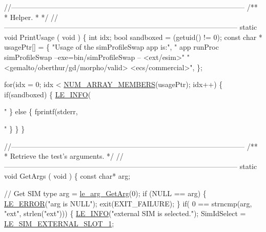 \begin{DoxyCodeInclude}
{{{{{{{{{{{{{\textcolor{comment}{//--------------------------------------------------------------------------------------------------}\textcolor{comment}{}
\textcolor{comment}{/**}
\textcolor{comment}{ * Helper.}
\textcolor{comment}{ *}
\textcolor{comment}{ */}
\textcolor{comment}{//--------------------------------------------------------------------------------------------------}
\textcolor{keyword}{static} \textcolor{keywordtype}{void} PrintUsage
(
    \textcolor{keywordtype}{void}
)
\{
    \textcolor{keywordtype}{int} idx;
    \textcolor{keywordtype}{bool} sandboxed = (getuid() != 0);
    \textcolor{keyword}{const} \textcolor{keywordtype}{char} * usagePtr[] =
    \{
            \textcolor{stringliteral}{"Usage of the simProfileSwap app is:"},
            \textcolor{stringliteral}{"   app runProc simProfileSwap --exe=bin/simProfileSwap -- <ext/esim>"}
              \textcolor{stringliteral}{" <gemalto/oberthur/gd/morpho/valid> <ecs/commercial>"},
    \};

    \textcolor{keywordflow}{for}(idx = 0; idx < \hyperlink{le__basics_8h_a8d8f28a045f43b477cafb67a99894c07}{NUM\_ARRAY\_MEMBERS}(usagePtr); idx++)
    \{
        \textcolor{keywordflow}{if}(sandboxed)
        \{
            \hyperlink{le__log_8h_a23e6d206faa64f612045d688cdde5808}{LE\_INFO}(\textcolor{stringliteral}{"%
        \}
        \textcolor{keywordflow}{else}
        \{
            fprintf(stderr, \textcolor{stringliteral}{"%
        \}
    \}
\}

\textcolor{comment}{//--------------------------------------------------------------------------------------------------}\textcolor{comment}{}
\textcolor{comment}{/**}
\textcolor{comment}{ * Retrieve the test's arguments.}
\textcolor{comment}{ */}
\textcolor{comment}{//--------------------------------------------------------------------------------------------------}
\textcolor{keyword}{static} \textcolor{keywordtype}{void} GetArgs
(
    \textcolor{keywordtype}{void}
)
\{
    \textcolor{keyword}{const} \textcolor{keywordtype}{char}*  arg;

    \textcolor{comment}{// Get SIM type}
    arg = \hyperlink{le__args_8h_a5ebca8229facd069785639cb3c1e273a}{le\_arg\_GetArg}(0);
    \textcolor{keywordflow}{if} (NULL == arg)
    \{
        \hyperlink{le__log_8h_a353590f91b3143a7ba3a416ae5a50c3d}{LE\_ERROR}(\textcolor{stringliteral}{"arg is NULL"});
        exit(EXIT\_FAILURE);
    \}
    \textcolor{keywordflow}{if}( 0 == strncmp(arg, \textcolor{stringliteral}{"ext"}, strlen(\textcolor{stringliteral}{"ext"})))
    \{
        \hyperlink{le__log_8h_a23e6d206faa64f612045d688cdde5808}{LE\_INFO}(\textcolor{stringliteral}{"external SIM is selected."});
        SimIdSelect = \hyperlink{le__sim__interface_8h_aace49df88426119626fb1ef4e544ccdda4270fb44e8fa7876f337864675b42f2d}{LE\_SIM\_EXTERNAL\_SLOT\_1};

}}}}}}}}}}}}}}}
\end{DoxyCodeInclude}
